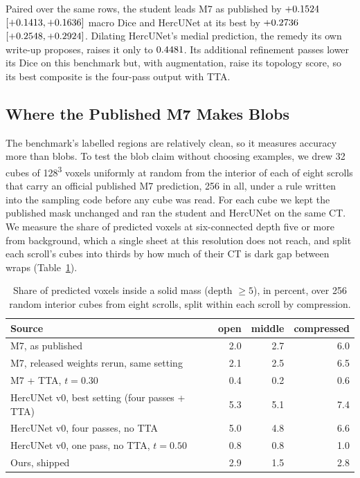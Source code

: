 Paired over the same rows, the student leads M7 as published by
$+0.1524$ $[+0.1413,+0.1636]$
macro Dice and HercUNet at its best by $+0.2736$
$[+0.2548,+0.2924]$. Dilating HercUNet's medial prediction,
the remedy its own write-up proposes, raises it only to $0.4481$.
Its additional refinement passes lower its Dice on this benchmark but, with
augmentation, raise its topology score, so its best composite is the four-pass
output with TTA.

\subsection{Where the Published M7 Makes Blobs}
\label{sec:blob-audit}

The benchmark's labelled regions are relatively clean, so it measures accuracy
more than blobs. To test the blob claim without choosing examples, we drew 32
cubes of 128\textsuperscript{3} voxels uniformly at random from the interior of
each of eight scrolls that carry an official published M7 prediction, 256 in
all, under a rule written into the sampling code before any cube was read. For
each cube we kept the published mask unchanged and ran the student and
HercUNet on the same CT. We measure the share of predicted voxels at
six-connected depth five or more from background, which a single sheet at this
resolution does not reach, and split each scroll's cubes into thirds by how much
of their CT is dark gap between wraps (Table~\ref{tab:blob}).

\begin{table}[t]
\caption{Share of predicted voxels inside a solid mass (depth $\geq 5$), in
percent, over 256 random interior cubes from eight scrolls, split within each
scroll by compression.}
\label{tab:blob}
\centering
\small
\setlength{\tabcolsep}{4pt}
\begin{tabular}{lrrr}
\toprule
Source & open & middle & compressed \\
\midrule
M7, as published & 2.0 & 2.7 & 6.0 \\
M7, released weights rerun, same setting & 2.1 & 2.5 & 6.5 \\
M7 + TTA, $t=0.30$ & 0.4 & 0.2 & 0.6 \\
HercUNet v0, best setting (four passes + TTA) & 5.3 & 5.1 & 7.4 \\
HercUNet v0, four passes, no TTA & 5.0 & 4.8 & 6.6 \\
HercUNet v0, one pass, no TTA, $t=0.50$ & 0.8 & 0.8 & 1.0 \\
Ours, shipped & 2.9 & 1.5 & 2.8 \\
\bottomrule
\end{tabular}
\end{table}

